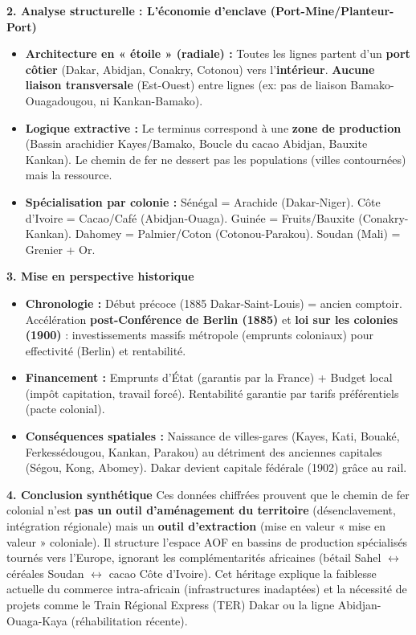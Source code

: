 \documentclass[11pt]{article}
\newcommand{\cle}[1]{{\popxbold\color{popdark}#1}}
\begin{document}
\begin{exoresolu}
\textbf{2. Analyse structurelle : L'économie d'enclave (Port-Mine/Planteur-Port)}
\begin{itemize}
    \item \textbf{Architecture en « étoile » (radiale) :} Toutes les lignes partent d'un \textbf{port côtier} (Dakar, Abidjan, Conakry, Cotonou) vers l'\textbf{intérieur}. \textbf{Aucune liaison transversale} (Est-Ouest) entre lignes (ex: pas de liaison Bamako-Ouagadougou, ni Kankan-Bamako).
    \item \textbf{Logique extractive :} Le terminus correspond à une \textbf{zone de production} (Bassin arachidier Kayes/Bamako, Boucle du cacao Abidjan, Bauxite Kankan). Le chemin de fer ne dessert pas les populations (villes contournées) mais la ressource.
    \item \textbf{Spécialisation par colonie :} Sénégal = Arachide (Dakar-Niger). Côte d'Ivoire = Cacao/Café (Abidjan-Ouaga). Guinée = Fruits/Bauxite (Conakry-Kankan). Dahomey = Palmier/Coton (Cotonou-Parakou). Soudan (Mali) = Grenier + Or.
\end{itemize}

\textbf{3. Mise en perspective historique}
\begin{itemize}
    \item \textbf{Chronologie :} Début précoce (1885 Dakar-Saint-Louis) = ancien comptoir. Accélération \textbf{post-Conférence de Berlin (1885)} et \textbf{loi sur les colonies (1900)} : investissements massifs métropole (emprunts coloniaux) pour \cle{effectivité} (Berlin) et rentabilité.
    \item \textbf{Financement :} Emprunts d'État (garantis par la France) + Budget local (impôt capitation, travail forcé). Rentabilité garantie par \cle{tarifs préférentiels} (pacte colonial).
    \item \textbf{Conséquences spatiales :} Naissance de \cle{villes-gares} (Kayes, Kati, Bouaké, Ferkessédougou, Kankan, Parakou) au détriment des anciennes capitales (Ségou, Kong, Abomey). \cle{Dakar} devient capitale fédérale (1902) grâce au rail.
\end{itemize}

\textbf{4. Conclusion synthétique}
Ces données chiffrées prouvent que le chemin de fer colonial n'est \textbf{pas un outil d'aménagement du territoire} (désenclavement, intégration régionale) mais un \textbf{outil d'extraction} (mise en valeur « mise en valeur » coloniale). Il structure l'espace AOF en \cle{bassins de production spécialisés} tournés vers l'Europe, ignorant les complémentarités africaines (bétail Sahel $\leftrightarrow$ céréales Soudan $\leftrightarrow$ cacao Côte d'Ivoire). Cet héritage explique la faiblesse actuelle du commerce intra-africain (infrastructures inadaptées) et la nécessité de projets comme le \cle{Train Régional Express (TER) Dakar} ou la \cle{ligne Abidjan-Ouaga-Kaya} (réhabilitation récente).
\end{exoresolu}
\end{document}
